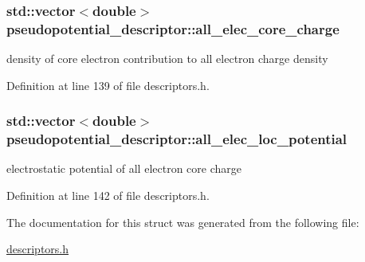\hypertarget{structpseudopotential__descriptor_a885a4c05a931acf8346f074f64914698}{}
\subsubsection[{all\+\_\+elec\+\_\+core\+\_\+charge}]{\setlength{\rightskip}{0pt plus 5cm}std\+::vector$<$double$>$ pseudopotential\+\_\+descriptor\+::all\+\_\+elec\+\_\+core\+\_\+charge}\label{structpseudopotential__descriptor_a885a4c05a931acf8346f074f64914698}


density of core electron contribution to all electron charge density 



Definition at line 139 of file descriptors.\+h.

\hypertarget{structpseudopotential__descriptor_a7dc4249e8f3d2c4a6a4c518edc3ca7f5}{}
\subsubsection[{all\+\_\+elec\+\_\+loc\+\_\+potential}]{\setlength{\rightskip}{0pt plus 5cm}std\+::vector$<$double$>$ pseudopotential\+\_\+descriptor\+::all\+\_\+elec\+\_\+loc\+\_\+potential}\label{structpseudopotential__descriptor_a7dc4249e8f3d2c4a6a4c518edc3ca7f5}


electrostatic potential of all electron core charge 



Definition at line 142 of file descriptors.\+h.



The documentation for this struct was generated from the following file\+:\begin{DoxyCompactItemize}
\item 
\hyperlink{descriptors_8h}{descriptors.\+h}\end{DoxyCompactItemize}
